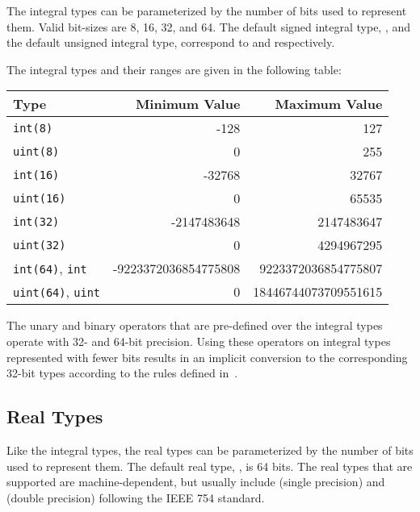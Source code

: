 The integral types can be parameterized by the number of bits used to
represent them.  Valid bit-sizes are 8, 16, 32, and 64.  The default signed integral type, , and the
default unsigned integral type,  correspond to 
 and  respectively.

%

The integral types and their ranges are given in the following table:

\begin{center}
\begin{tabular}{|l|r|r|}
\hline
{\bf Type} & {\bf Minimum Value} & {\bf Maximum Value} \\
\hline
{\tt int(8)} & -128 & 127 \\
{\tt uint(8)} & 0 & 255 \\
{\tt int(16)} & -32768 & 32767 \\
{\tt uint(16)} & 0 & 65535 \\
{\tt int(32)} & -2147483648 & 2147483647 \\
{\tt uint(32)} & 0 & 4294967295 \\
{\tt int(64)}, {\tt int} & -9223372036854775808 & 9223372036854775807 \\
{\tt uint(64)}, {\tt uint} & 0 & 18446744073709551615 \\
\hline
\end{tabular}
\end{center}

The unary and binary operators that are pre-defined over the integral
types operate with 32- and 64-bit precision.  Using these operators on
integral types represented with fewer bits results in an implicit
conversion to the corresponding 32-bit types
according to the rules defined in~.


\subsection{Real Types}
\label{Real_Types}

Like the integral types, the real types can be parameterized by the
number of bits used to represent them.  The default real
type, , is 64 bits.  The real types that are supported are
machine-dependent, but usually include  (single
precision) and  (double precision) following the IEEE
754 standard.  

